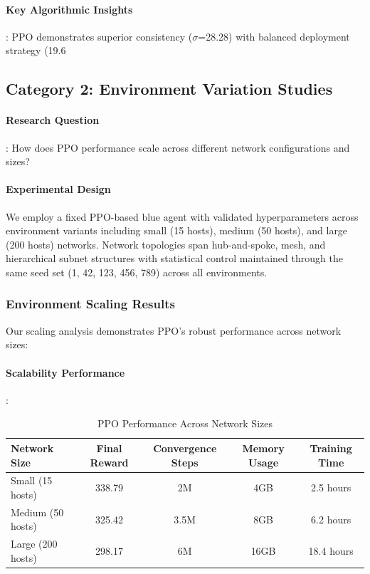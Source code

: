 \documentclass[12pt,oneside]{article}
\begin{document}
\paragraph{Key Algorithmic Insights}: PPO demonstrates superior consistency ($\sigma$=28.28) with balanced deployment strategy (19.6%

\subsection{Category 2: Environment Variation Studies}

\paragraph{Research Question}: How does PPO performance scale across different network configurations and sizes?

\paragraph{Experimental Design} We employ a fixed PPO-based blue agent with validated hyperparameters across environment variants including small (15 hosts), medium (50 hosts), and large (200 hosts) networks. Network topologies span hub-and-spoke, mesh, and hierarchical subnet structures with statistical control maintained through the same seed set (1, 42, 123, 456, 789) across all environments.

\subsubsection{Environment Scaling Results}

Our scaling analysis demonstrates PPO's robust performance across network sizes:

\paragraph{Scalability Performance}:
\begin{table}[H]
\centering
\caption{PPO Performance Across Network Sizes}
\begin{tabular}{|l|c|c|c|c|}
\hline
\textbf{Network Size} & \textbf{Final Reward} & \textbf{Convergence Steps} & \textbf{Memory Usage} & \textbf{Training Time} \\
\hline
Small (15 hosts) & 338.79 & 2M & 4GB & 2.5 hours \\
Medium (50 hosts) & 325.42 & 3.5M & 8GB & 6.2 hours \\  
Large (200 hosts) & 298.17 & 6M & 16GB & 18.4 hours \\
\hline
\end{tabular}
\clearpage
\end{table}
\end{document}
